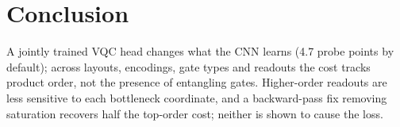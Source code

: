 \section{Conclusion}
\label{sec:conclusion}

A jointly trained VQC head changes what the CNN learns (4.7 probe points by default); across layouts, encodings, gate types and readouts the cost tracks product order, not the presence of entangling gates. Higher-order readouts are less sensitive to each bottleneck coordinate, and a backward-pass fix removing saturation recovers half the top-order cost; neither is shown to cause the loss.
